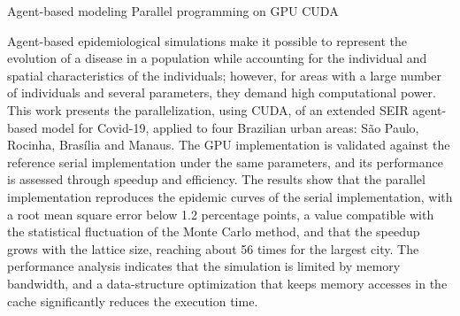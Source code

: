 {Agent-based modeling}
{Parallel programming on GPU}
{CUDA}



\noindent
Agent-based epidemiological simulations make it possible to represent the evolution of a disease in a population while accounting for the individual and spatial characteristics of the individuals; however, for areas with a large number of individuals and several parameters, they demand high computational power. This work presents the parallelization, using CUDA, of an extended SEIR agent-based model for Covid-19, applied to four Brazilian urban areas: São Paulo, Rocinha, Brasília and Manaus. The GPU implementation is validated against the reference serial implementation under the same parameters, and its performance is assessed through speedup and efficiency. The results show that the parallel implementation reproduces the epidemic curves of the serial implementation, with a root mean square error below 1.2 percentage points, a value compatible with the statistical fluctuation of the Monte Carlo method, and that the speedup grows with the lattice size, reaching about 56 times for the largest city. The performance analysis indicates that the simulation is limited by memory bandwidth, and a data-structure optimization that keeps memory accesses in the cache significantly reduces the execution time.

\printkeys %
